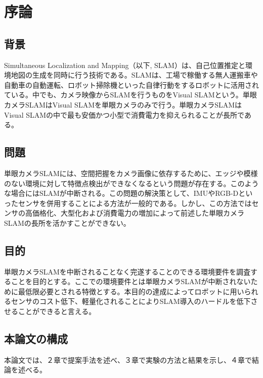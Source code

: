 \chapter{序論}

\section{背景}

Simultaneous Localization and Mapping（以下, SLAM）は、自己位置推定と環境地図の生成を同時に行う技術である。SLAMは、工場で稼働する無人運搬車や自動車の自動運転、ロボット掃除機といった自律行動をするロボットに活用されている\cite{Kondo2019}。中でも、カメラ映像からSLAMを行うものをVisual SLAMという。単眼カメラSLAMはVisual SLAMを単眼カメラのみで行う。単眼カメラSLAMはVisual SLAMの中で最も安価かつ小型で消費電力を抑えられることが長所である\cite{Artal2017}。
\section{問題}

単眼カメラSLAMには、空間把握をカメラ画像に依存するために、エッジや模様のない環境に対して特徴点検出ができなくなるという問題が存在する。このような場合にはSLAMが中断される。この問題の解決策として、IMUやRGB-Dといったセンサを併用することによる方法が一般的である。しかし、この方法ではセンサの高価格化、大型化および消費電力の増加によって前述した単眼カメラSLAMの長所を活かすことができない。

\section{目的}

単眼カメラSLAMを中断されることなく完遂することのできる環境要件を調査することを目的とする。ここでの環境要件とは単眼カメラSLAMが中断されないために最低限必要とされる特徴とする。本目的の達成によってロボットに用いられるセンサのコスト低下、軽量化されることによりSLAM導入のハードルを低下させることができると言える。

\section{本論文の構成}

本論文では、２章で提案手法を述べ、３章で実験の方法と結果を示し、４章で結論を述べる。

%
